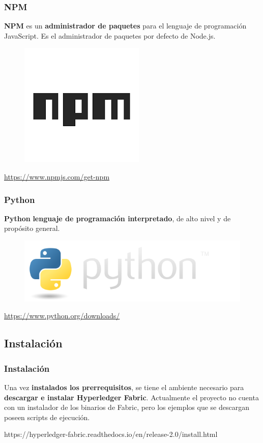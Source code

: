 \documentclass{beamer}
\begin{document}
	\begin{frame}
		\frametitle{NPM}
		\textbf{NPM} es un \textbf{administrador de paquetes} para el lenguaje de programación JavaScript. Es el administrador de paquetes por defecto de Node.js.
		\begin{figure}[h]
			\includegraphics[scale=.3]{npm}
			\centering
		\end{figure}
		\begin{center}
			\tiny{\url{https://www.npmjs.com/get-npm}}
		\end{center}
	\end{frame}
	
	\begin{frame}
		\frametitle{Python}
		\textbf{Python} \textbf{lenguaje de programación interpretado}, de alto nivel y de propósito general.
		\begin{figure}[h]
			\includegraphics[scale=.3]{python}
			\centering
		\end{figure}
		\begin{center}
			\tiny{\url{https://www.python.org/downloads/}}
		\end{center}
	\end{frame}

	\subsection{Instalación}
	
	\begin{frame}
		\frametitle{Instalación}
		Una vez \textbf{instalados los prerrequisitos}, se tiene el ambiente necesario para \textbf{descargar e instalar Hyperledger Fabric}. Actualmente el proyecto no cuenta con un instalador de los binarios de Fabric, pero los ejemplos que se descargan poseen scripts de ejecución.
		\begin{center}
			\tiny{https://hyperledger-fabric.readthedocs.io/en/release-2.0/install.html}
		\end{center}
	\end{frame}
	
\end{document}
